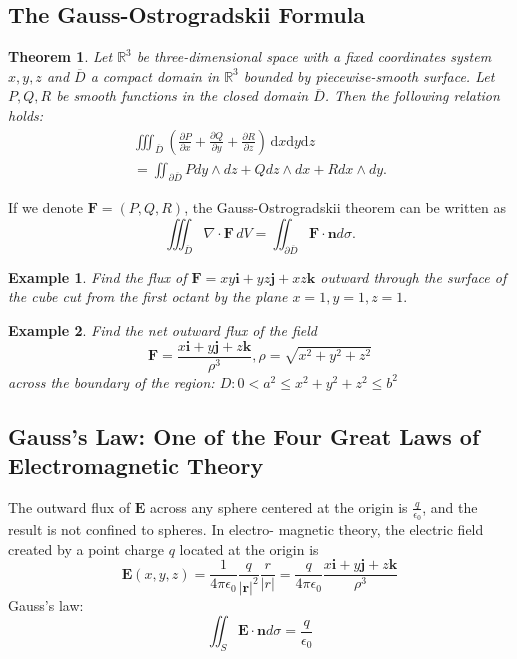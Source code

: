 \documentclass[a4paper,12pt]{article}
\newtheorem{example}{Example}             %
\newtheorem{theorem}{Theorem}[section]  %
\begin{document}
\begin{CJK}{UTF8}{gbsn}
\subsection{The Gauss-Ostrogradskii Formula}
\begin{theorem}
    Let $\mathbb{R}^3$ be three-dimensional space with a fixed coordinates 
    system $x,y,z$ and $\overline{D}$ a compact domain in $\mathbb{R}^3$ 
    bounded by piecewise-smooth surface. Let $P, Q, R$ be smooth functions 
    in the closed domain $\overline{D}$. Then the following relation holds:
    \[
        \begin{split}
        \iiint_{\overline{D}} \left(\frac{\partial P}{\partial x} + \frac{\partial Q}{\partial y}
        + \frac{\partial R}{\partial z}\right)\,\mathrm{d}x\mathrm{d}y\mathrm{d}z \\
            = \iint_{\partial \overline{D}} P dy\wedge dz + Qdz\wedge dx + R dx \wedge dy.
        \end{split}
    \]
\end{theorem}

If we denote $\bm{F} = (P, Q, R)$, the Gauss-Ostrogradskii theorem can be 
written as \[
    \iiint_{\overline{D}} \nabla \cdot \bm{F}\, dV = \iint_{\partial \overline{D}} 
    \bm{F} \cdot \bm{n} d\sigma.
\]
\begin{example}
    Find the flux of $\bm{F} = xy\bm{i}+yz\bm{j}+xz\bm{k}$ outward 
    through the surface of the cube cut from the first octant 
    by the plane $x = 1, y = 1, z = 1.$
\end{example}

\begin{example}
    Find the net outward flux of the field 
    \[
        \bm{F} = \frac{x\bm{i} + y\bm{j} + z\bm{k}}{\rho^3} ,
        \rho = \sqrt{x^2 + y^2 + z^2}
        \]
    across the boundary of the region: $D: 0<a^2\le x^2+y^2+z^2\le b^2$
\end{example}

\subsection{Gauss's Law: One of the Four Great Laws of Electromagnetic 
Theory}
The outward flux of $\bm{E}$ across any sphere centered at the origin 
is $\frac{q}{\epsilon_0}$, and the result is not confined to spheres. In electro-
magnetic theory, the electric field created by a point charge $q$ located 
at the origin is 
\[
    \bm{E}(x,y,z) = \frac{1}{4\pi\epsilon_0}\frac{q}{|\bm{r}|^2}\frac{r}{|r|} 
     = \frac{q}{4\pi\epsilon_0}\frac{x\bm{i}+y\bm{j}+z\bm{k}}{\rho^3}
     \]
Gauss's law:
\[
    \iint_S \bm{E}\cdot\bm{n}d\sigma = \frac{q}{\epsilon_0}
\]

\end{CJK}
\end{document}
